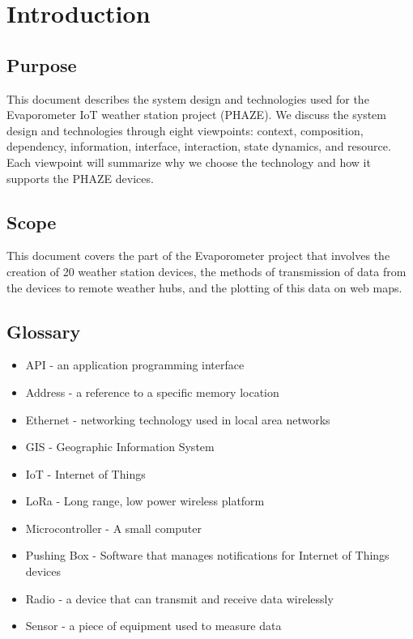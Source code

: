 \documentclass[onecolumn, draftclsnofoot,10pt, compsoc]{IEEEtran}
\begin{document}
\newpage
{}
\tableofcontents
\clearpage

\section{Introduction}
\subsection{Purpose}
This document describes the system design and technologies used for the Evaporometer IoT weather station project (PHAZE).  We discuss the system design and technologies through eight viewpoints: context, composition, dependency, information, interface, interaction, state dynamics, and resource.  Each viewpoint will summarize why we choose the technology and how it supports the PHAZE devices.

\subsection{Scope}
This document covers the part of the Evaporometer project that involves the creation of 20 weather station devices, the methods of transmission of data from the devices to remote weather hubs, and the plotting of this data on web maps.


\subsection{Glossary}
\begin{itemize}
	\item API - an application programming interface
	\item Address - a reference to a specific memory location
	\item Ethernet - networking technology used in local area networks
    \item GIS - Geographic Information System
    \item IoT - Internet of Things
    \item LoRa - Long range, low power wireless platform
    \item Microcontroller - A small computer
    \item Pushing Box - Software that manages notifications for Internet of Things devices
    \item Radio - a device that can transmit and receive data wirelessly
	\item Sensor - a piece of equipment used to measure data
\end{itemize}
\end{document}
